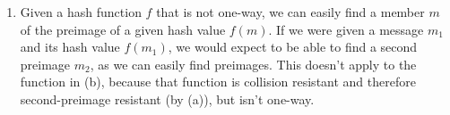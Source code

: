 \begin{enumerate}
\item Given a hash function $f$ that is not one-way, we can easily find a member
$m$ of the preimage of a given hash value $f(m)$. If we were given a message
$m_1$ and its hash value $f(m_1)$, we would expect to be able to find a second
preimage $m_2$, as we can easily find preimages. This doesn't apply to the
function in (b), because that function is collision resistant and therefore
second-preimage resistant (by (a)), but isn't one-way.

\end{enumerate}
